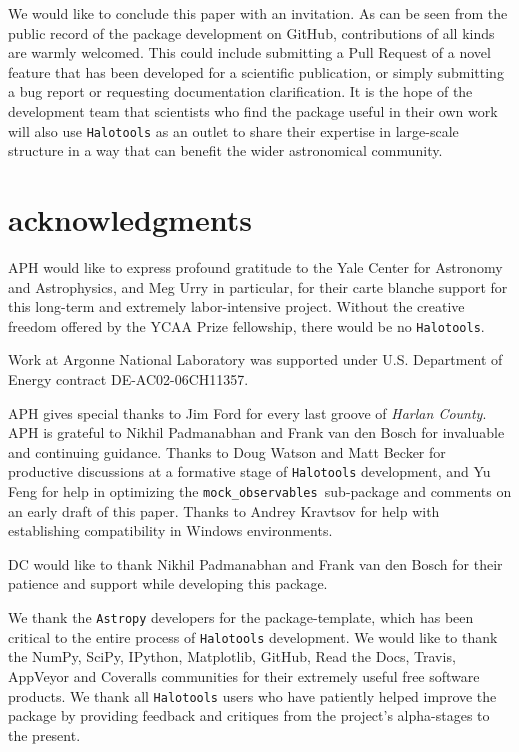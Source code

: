\documentclass[twocolumn, tighten]{aastex6}
\newcommand{\mockobs}{{\tt mock\_observables }}
\begin{document}
We would like to conclude this paper with an invitation. As can be seen from the public record of the package development on GitHub, contributions of all kinds are warmly welcomed. This could include submitting a Pull Request of a novel feature that has been developed for a scientific publication, or simply submitting a bug report or requesting documentation clarification. It is the hope of the development team that scientists who find the package useful in their own work will also use {\tt Halotools} as an outlet to share their expertise in large-scale structure in a way that can benefit the wider astronomical community.


\section{acknowledgments}

APH would like to express profound gratitude to the Yale Center for Astronomy and Astrophysics, and Meg Urry in particular, for their carte blanche support for this long-term and extremely labor-intensive project. Without the creative freedom offered by the YCAA Prize fellowship, there would be no {\tt Halotools}.

Work at Argonne National Laboratory was supported under U.S. Department of Energy contract DE-AC02-06CH11357.

APH gives special thanks to Jim Ford for every last groove of {\em Harlan County}. APH is grateful to Nikhil Padmanabhan and Frank van den Bosch for invaluable and continuing guidance. Thanks to Doug Watson and Matt Becker for productive discussions at a formative stage of {\tt Halotools} development, and Yu Feng for help in optimizing the \mockobs sub-package and comments on an early draft of this paper. Thanks to Andrey Kravtsov for help with establishing compatibility in Windows environments.

DC would like to thank Nikhil Padmanabhan and Frank van den Bosch for their patience and support while developing this package.

We thank the {\tt Astropy} developers for the package-template, which has been critical to the entire process of {\tt Halotools} development.
We would like to thank the NumPy, SciPy, IPython, Matplotlib, GitHub, Read the Docs, Travis, AppVeyor and Coveralls communities for their extremely useful free software products. We thank all {\tt Halotools} users who have patiently helped improve the package by providing feedback and critiques from the project's alpha-stages to the present.
\end{document}
